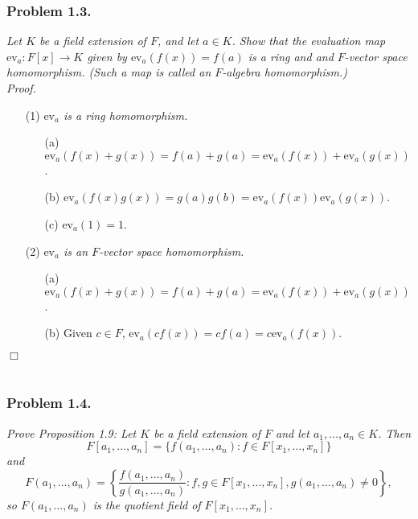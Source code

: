\documentclass{article}
\begin{document}



\subsubsection*{Problem 1.3.}
\emph{Let $K$ be a field extension of $F$, and let $a \in K$.
Show that the evaluation map $\text{ev}_a: F[x] \to K$ given by
$\text{ev}_a(f(x)) = f(a)$ is a ring and and $F$-vector space homomorphism.
(Such a map is called an $F$-algebra homomorphism.) } \\

\emph{Proof.}
\begin{enumerate}
\item[(1)]
\emph{$\text{ev}_a$ is a ring homomorphism.}
  \begin{enumerate}
  \item[(a)]
  $\text{ev}_a(f(x)+g(x)) = f(a) + g(a) = \text{ev}_a(f(x)) + \text{ev}_a(g(x))$.
  \item[(b)]
  $\text{ev}_a(f(x)g(x)) = g(a)g(b) = \text{ev}_a(f(x)) \text{ev}_a(g(x))$.
  \item[(c)]
  $\text{ev}_a(1) = 1$.
  \end{enumerate}
\item[(2)]
\emph{$\text{ev}_a$ is an $F$-vector space homomorphism.}
  \begin{enumerate}
  \item[(a)]
  $\text{ev}_a(f(x)+g(x)) = f(a) + g(a) = \text{ev}_a(f(x)) + \text{ev}_a(g(x))$.
  \item[(b)]
  Given $c \in F$, $\text{ev}_a(cf(x)) = cf(a) = c\text{ev}_a(f(x))$.
  \end{enumerate}
\end{enumerate}
$\Box$ \\\\





\subsubsection*{Problem 1.4.}
\emph{Prove Proposition 1.9:
Let $K$ be a field extension of $F$ and let $a_1, \ldots, a_n \in K$.
Then
$$F[a_1, \ldots, a_n] = \{ f(a_1, \ldots, a_n) : f \in F[x_1, \ldots, x_n] \}$$
and
$$F(a_1, \ldots, a_n) = \left\{
\frac{f(a_1, \ldots, a_n)}{g(a_1, \ldots, a_n)} : f, g \in F[x_1, \ldots, x_n],
g(a_1, \ldots, a_n) \neq 0
\right\},$$
so $F(a_1, \ldots, a_n)$ is the quotient field of $F[x_1, \ldots, x_n]$.
} \\
\end{document}

